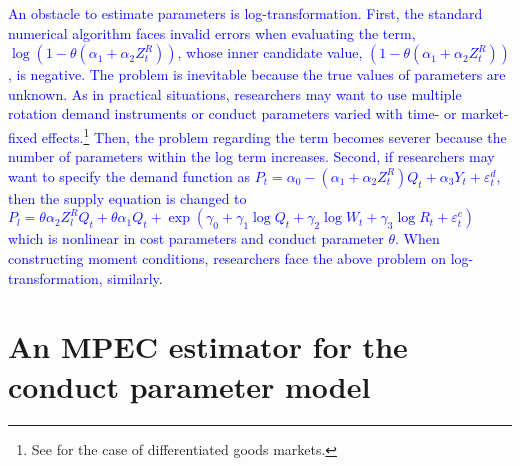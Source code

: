 \documentclass[11pt, a4paper]{article}
\begin{document}
\textcolor{blue}{An obstacle to estimate parameters is log-transformation. First, the standard numerical algorithm faces invalid errors when evaluating the term, $\log (1 - \theta (\alpha_1 + \alpha_2 Z^{R}_{t}))$, whose inner candidate value, $(1 - \theta (\alpha_1 + \alpha_2 Z^{R}_{t}))$, is negative. The problem is inevitable because the true values of parameters are unknown. As in practical situations, researchers may want to use multiple rotation demand instruments or conduct parameters varied with time- or market- fixed effects.\footnote{See \cite{michel2018estimating} for the case of differentiated goods markets.} Then, the problem regarding the term becomes severer because the number of parameters within the log term increases. Second, if researchers may want to specify the demand function as $P_t=\alpha_0-\left(\alpha_1+\alpha_2 Z_t^R\right) Q_t+\alpha_3 Y_t+\varepsilon_t^d$, then the supply equation is changed to $P_l=\theta \alpha_2 Z_l^R Q_t+\theta \alpha_1Q_t+\exp(\gamma_0+\gamma_1 \log Q_t+\gamma_2 \log W_t+\gamma_3 \log R_t+\varepsilon_t^c)$ which is nonlinear in cost parameters and conduct parameter $\theta$. When constructing moment conditions, researchers face the above problem on log-transformation, similarly.}


\section{An MPEC estimator for the conduct parameter model}
\end{document}

